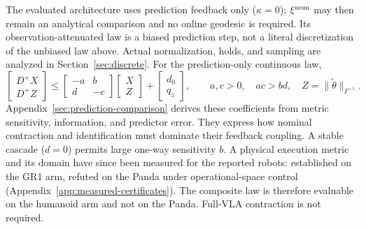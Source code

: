 The evaluated architecture uses prediction feedback only ($\kappa=0$);
$\xi^{\rm nom}$ may then remain an analytical comparison and no online geodesic
is required. Its observation-attenuated law is a biased prediction step, not a literal
discretization of the unbiased law above. Actual normalization, holds, and
sampling are analyzed in Section~\ref{sec:discrete}. For the prediction-only continuous law,
\begin{equation}
 \begin{bmatrix}D^+X\\D^+Z\end{bmatrix}\le
 \begin{bmatrix}-a&b\\d&-c\end{bmatrix}
 \begin{bmatrix}X\\Z\end{bmatrix}+\begin{bmatrix}d_0\\q_z\end{bmatrix},
 \qquad a,c>0,\quad ac>bd,\quad Z=\|\tilde\theta\|_{\Gamma^{-1}}.
 \label{eq:prediction-comparison}
\end{equation}
Appendix~\ref{sec:prediction-comparison} derives these coefficients from
metric sensitivity, information, and predictor error. They express how
nominal contraction and identification must dominate their feedback
coupling. A stable cascade ($d=0$) permits large one-way sensitivity $b$.
A physical execution metric and its domain have since been measured for the
reported robots: established on the GR1 arm, refuted on the Panda under
operational-space control (Appendix~\ref{app:measured-certificates}). The
composite law is therefore evaluable on the humanoid arm and not on the
Panda. Full-VLA contraction is not required.
